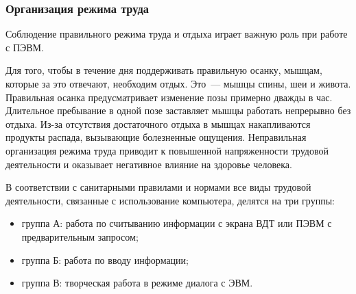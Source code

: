 \subsubsection{Организация режима труда}
Соблюдение правильного режима труда и отдыха играет важную роль при работе с  ПЭВМ.

Для того, чтобы в течение дня поддерживать  правильную осанку, мышцам, которые за это отвечают, необходим отдых. Это~--- мышцы спины, шеи и живота. Правильная осанка предусматривает изменение позы примерно дважды в час. Длительное пребывание в одной позе заставляет мышцы работать непрерывно без отдыха. Из-за отсутствия достаточного отдыха в мышцах накапливаются продукты распада, вызывающие болезненные ощущения. Неправильная организация режима труда приводит к повышенной напряженности трудовой деятельности и оказывает негативное влияние на здоровье человека.

В соответствии с санитарными правилами и нормами  все виды трудовой деятельности, связанные с использование компьютера, делятся на три группы:
\begin{itemize}
\item группа А: работа по считыванию информации с экрана ВДТ или ПЭВМ с предварительным запросом;
\item группа Б: работа по вводу информации;
\item группа В: творческая работа в режиме диалога с ЭВМ.
\end{itemize}

